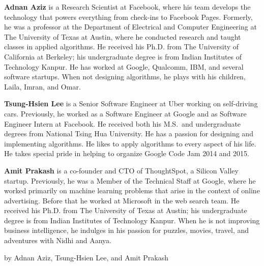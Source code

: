 \documentclass[10pt,openany,twoside,letterpaper,extrafontsizes]{memoir}
\newif\ifCpp
\newif\ifJava
\newif\ifPython
\newcommand{\vs}{%
\vspace{2mm}%
\noindent%
}
\begin{document}
\frontmatter

\thispagestyle{empty}
\titleGMforEPI

\newpage

\thispagestyle{empty}
\noindent
\textbf{Adnan Aziz} is a Research Scientist at Facebook, where his team develops the technology that powers everything from check-ins to Facebook Pages.
Formerly, he was a professor at the Department of Electrical and Computer Engineering at The University of Texas at Austin, where he conducted research and taught classes in applied algorithms.
He received his Ph.D. from The University of California at Berkeley;
his undergraduate degree is from Indian Institutes of Technology Kanpur.
He has worked at Google, Qualcomm, IBM, and several software startups.
When not designing algorithms, he plays with his children, Laila, Imran, and Omar.
\vs

\noindent
\textbf{Tsung-Hsien Lee} is a Senior Software Engineer at Uber working on self-driving cars.
Previously, he worked as a Software Engineer at Google and as Software Engineer Intern at Facebook.
He received both his M.S.~and undergraduate degrees from National Tsing Hua University.
He has a passion for designing and implementing algorithms.
He likes to apply algorithms to every aspect of his life.
He takes special pride in helping to organize Google Code Jam 2014 and 2015.
\vs

\noindent
\textbf{Amit Prakash} is a co-founder and CTO of ThoughtSpot, a Silicon Valley startup.
Previously, he was a Member of the Technical Staff at Google, where he worked primarily on machine learning problems that arise in the context of online advertising.
Before that he worked at Microsoft in the web search team.
He received his Ph.D. from The University of Texas at Austin;
his undergraduate degree is from Indian Institutes of Technology Kanpur.
When he is not improving business intelligence, he indulges in his passion for puzzles, movies, travel, and adventures with Nidhi and Aanya.

\vfill
\noindent
\ifCpp
\textbf{Elements of Programming Interviews: The Insiders' Guide}\\
\fi
\ifJava
\textbf{Elements of Programming Interviews in Java: The Insiders' Guide}\\
\fi
\ifPython
\textbf{Elements of Programming Interviews in Python: The Insiders' Guide}\\
\fi
by Adnan Aziz, Tsung-Hsien Lee, and Amit Prakash
\end{document}
